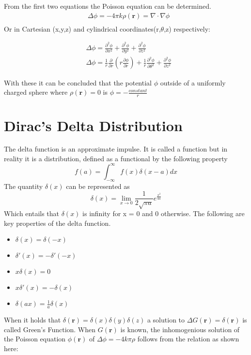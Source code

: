 \noindent From the first two equations the Poisson equation can be determined.
\begin{equation}
\begin{aligned}
   &\Delta \phi = -4\pi k \rho(\textbf{r}) = \nabla \cdot \nabla \phi\\
\end{aligned}
\end{equation}
\noindent Or in Cartesian (x,y,z) and cylindrical coordinates(r,$\theta$,z) respectively:

\begin{equation}
    \begin{aligned}
    &\Delta \phi = \frac{\partial^2 \phi}{\partial x^2} + \frac{\partial^2 \phi}{\partial y^2} + \frac{\partial^2 \phi}{\partial z^2}\\
    &\Delta \phi= \frac{1}{r}\frac{\partial}{\partial r}\left(r\frac{\partial \phi}{\partial r}\right) + \frac{1}{r}\frac{\partial^2 \phi}{\partial \theta^2} + \frac{\partial^2 \phi}{\partial z^2}
    \end{aligned}
\end{equation}

\noindent With these it can be concluded that the potential $\phi$ outside of a uniformly charged sphere where $ \displaystyle \rho(\textbf{r}) = 0$ is $\displaystyle \phi = - \frac{constant}{r}$


\section{Dirac's Delta Distribution}
The delta function is an approximate impulse. It is called a function but in reality it is a distribution, defined as a functional by the following property
\begin{equation}
    f(a) =  \int_{-\infty}^\infty f(x)\delta(x-a)dx
\end{equation}
The quantity $\delta(x)$ can be represented as
\begin{equation}
    \delta (x) = \lim_{x\to 0} \frac{1}{2\sqrt{\pi a}}e^{\frac{x^2}{4a}}
\end{equation}
Which entails that $\delta(x)$ is infinity for x = 0 and 0 otherwise. The following are key properties of the delta function.
\begin{itemize}
    \item $\delta(x) = \delta(-x)$
    \item $\delta'(x) = - \delta'(-x)$
    \item $x\delta(x) = 0$
    \item $x\delta'(x) = -\delta(x)$
    \item $\delta(ax) = \frac{1}{a} \delta(x)$
\end{itemize} 
\noindent When it holds that $\delta(\textbf{r}) = \delta(x)\delta(y)\delta(z)$ a solution to $\Delta G(\textbf{r}) = \delta(\textbf{r}) $ is called Green's Function. When $G(\textbf{r})$ is known, the inhomogenious solution of the Poisson equation $\phi(\textbf{r})$ of $\Delta\phi = -4k\pi \rho$ follows from the relation as shown here:

